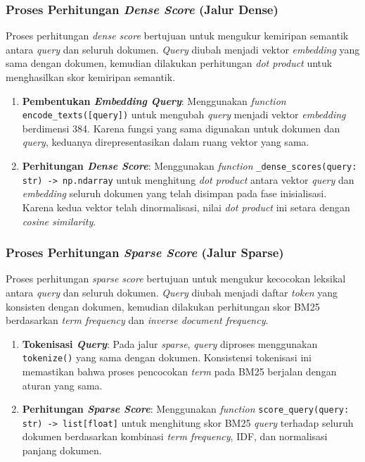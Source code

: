 \documentclass[12pt,a4paper]{article}
\begin{document}
\subsubsection*{Proses Perhitungan \textit{Dense Score} (Jalur Dense)}

Proses perhitungan \textit{dense score} bertujuan untuk mengukur kemiripan semantik antara \textit{query} dan seluruh dokumen. \textit{Query} diubah menjadi vektor \textit{embedding} yang sama dengan dokumen, kemudian dilakukan perhitungan \textit{dot product} untuk menghasilkan skor kemiripan semantik.

\begin{enumerate}[label=\alph*., leftmargin=1.1cm]
\item \textbf{Pembentukan \textit{Embedding Query}}: Menggunakan \textit{function} \texttt{encode\_texts([query])} untuk mengubah \textit{query} menjadi vektor \textit{embedding} berdimensi 384. Karena fungsi yang sama digunakan untuk dokumen dan \textit{query}, keduanya direpresentasikan dalam ruang vektor yang sama.

\item \textbf{Perhitungan \textit{Dense Score}}: Menggunakan \textit{function} \texttt{\_dense\_scores(query: str) -> np.ndarray} untuk menghitung \textit{dot product} antara vektor \textit{query} dan \textit{embedding} seluruh dokumen yang telah disimpan pada fase inisialisasi. Karena kedua vektor telah dinormalisasi, nilai \textit{dot product} ini setara dengan \textit{cosine similarity}.
\end{enumerate}

\subsubsection*{Proses Perhitungan \textit{Sparse Score} (Jalur Sparse)}

Proses perhitungan \textit{sparse score} bertujuan untuk mengukur kecocokan leksikal antara \textit{query} dan seluruh dokumen. \textit{Query} diubah menjadi daftar \textit{token} yang konsisten dengan dokumen, kemudian dilakukan perhitungan skor BM25 berdasarkan \textit{term frequency} dan \textit{inverse document frequency}.

\begin{enumerate}[label=\alph*., leftmargin=1.1cm]
\item \textbf{Tokenisasi \textit{Query}}: Pada jalur \textit{sparse}, \textit{query} diproses menggunakan \texttt{tokenize()} yang sama dengan dokumen. Konsistensi tokenisasi ini memastikan bahwa proses pencocokan \textit{term} pada BM25 berjalan dengan aturan yang sama.

\item \textbf{Perhitungan \textit{Sparse Score}}: Menggunakan \textit{function} \texttt{score\_query(query: str) -> list[float]} untuk menghitung skor BM25 \textit{query} terhadap seluruh dokumen berdasarkan kombinasi \textit{term frequency}, IDF, dan normalisasi panjang dokumen.
\end{enumerate}
\end{document}
